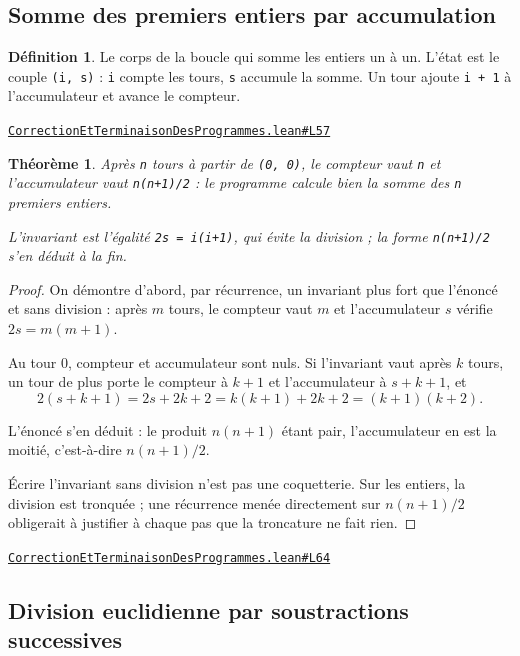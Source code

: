 \documentclass[11pt,a4paper]{article}
\theoremstyle{definition}
\newtheorem{definition}{Définition}
\theoremstyle{plain}
\newtheorem{theoreme}{Théorème}
\newcommand{\source}[2]{\par\smallskip\noindent\hfill{\footnotesize\href{#1}{\texttt{#2}}}\par\smallskip}
\begin{document}
\subsection{Somme des premiers entiers par accumulation}

\begin{definition}
Le corps de la boucle qui somme les entiers un à un. L'état est le couple
\texttt{(i, s)} : \texttt{i} compte les tours, \texttt{s} accumule la somme. Un tour ajoute \texttt{i + 1} à
l'accumulateur et avance le compteur.
\end{definition}
\source{https://github.com/Commutator-IO/learn-lean/blob/main/courses/02-lycee/11-informatique-nsi/CorrectionEtTerminaisonDesProgrammes.lean\#L57}{CorrectionEtTerminaisonDesProgrammes.lean\#L57}

\begin{theoreme}
Après \texttt{n} tours à partir de \texttt{(0, 0)}, le compteur vaut \texttt{n} et l'accumulateur vaut
\texttt{n(n+1)/2} : le programme calcule bien la somme des \texttt{n} premiers entiers.

L'invariant est l'égalité \texttt{2s = i(i+1)}, qui évite la division ; la forme
\texttt{n(n+1)/2} s'en déduit à la fin.
\end{theoreme}
\begin{proof}
On démontre d'abord, par récurrence, un invariant plus fort que l'énoncé et sans
division : après \(m\) tours, le compteur vaut \(m\) et l'accumulateur \(s\) vérifie
\(2s = m(m+1)\).

Au tour \(0\), compteur et accumulateur sont nuls. Si l'invariant vaut après \(k\)
tours, un tour de plus porte le compteur à \(k+1\) et l'accumulateur à \(s + k + 1\), et
\[ 2(s + k + 1) = 2s + 2k + 2 = k(k+1) + 2k + 2 = (k+1)(k+2) . \]

L'énoncé s'en déduit : le produit \(n(n+1)\) étant pair, l'accumulateur en est la
moitié, c'est-à-dire \(n(n+1)/2\).

Écrire l'invariant sans division n'est pas une coquetterie. Sur les entiers, la division
est tronquée ; une récurrence menée directement sur \(n(n+1)/2\) obligerait à justifier
à chaque pas que la troncature ne fait rien.
\end{proof}
\source{https://github.com/Commutator-IO/learn-lean/blob/main/courses/02-lycee/11-informatique-nsi/CorrectionEtTerminaisonDesProgrammes.lean\#L64}{CorrectionEtTerminaisonDesProgrammes.lean\#L64}

\subsection{Division euclidienne par soustractions successives}
\end{document}
